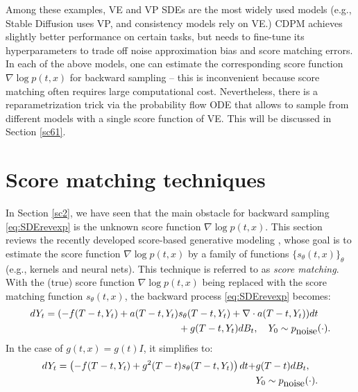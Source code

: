 \documentclass[letterpaper,11pt,reqno]{amsart}
\numberwithin{equation}{section}
\begin{document}
\quad Among these examples, VE and VP SDEs are the most widely used models
(e.g., Stable Diffusion uses VP, and consistency models rely on VE.)
CDPM achieves slightly better performance on certain tasks,
but needs to fine-tune its hyperparameters to trade off 
noise approximation bias and score matching errors.
In each of the above models,
one can estimate the corresponding score function $\nabla \log p(t,x)$ for backward sampling --
this is inconvenient because score matching often requires large computational cost. 
Nevertheless, there is a reparametrization trick via the probability flow ODE
that allows to sample from different models with a single score function of VE.
This will be discussed in Section \ref{sc61}.


\section{Score matching techniques}
\label{sc3}

\quad In Section \ref{sc2},
we have seen that 
the main obstacle for backward sampling \eqref{eq:SDErevexp}
is the unknown score function $\nabla \log p(t,x)$.
This section reviews the recently developed 
score-based generative modeling \cite{Ho20, Song19, Song20},
whose goal is to estimate the score function $\nabla \log p (t,x)$
by a family of functions $\{s_\theta(t,x)\}_\theta$ (e.g., kernels and neural nets).
This technique is referred to as {\em score matching}.
With the (true) score function $\nabla \log p (t,x)$ 
being replaced with the score matching function $s_\theta(t,x)$,
the backward process \eqref{eq:SDErevexp} becomes:
\begin{equation}
\label{eq:SDErevtheta}
\begin{aligned}
dY_t = (-f(T-t, Y_t) +  a(T-t, Y_t) & s_\theta (T-t, Y_t) 
 + \nabla \cdot a(T-t, Y_t))dt \\
& + g(T-t, Y_t ) dB_t, \quad Y_0 \sim p_{\tiny \mbox{noise}}(\cdot).
 \end{aligned}
\end{equation}
In the case of $g(t,x) = g(t) I$, it simplifies to:
\begin{equation}
\label{eq:SDErevtheta2}
\begin{aligned}
dY_t = \left(-f(T-t, Y_t) + g^2(T-t) s_\theta (T-t, Y_t) \right)dt  + & g(T-t ) dB_t, 
\\ &Y_0 \sim p_{\tiny \mbox{noise}}(\cdot).
\end{aligned}
\end{equation}
\end{document}
